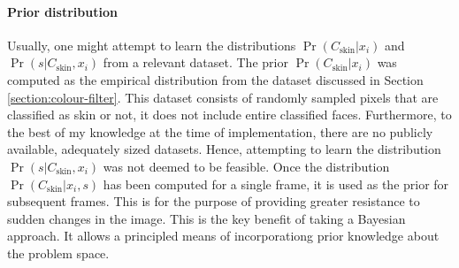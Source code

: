 \paragraph{Prior distribution}
Usually, one might attempt to learn the distributions $\Pr(C_\mathrm{skin}|x_i)$ and $\Pr(s|C_\mathrm{skin}, x_i)$ from  a relevant dataset.
The prior $\Pr(C_\mathrm{skin}|x_i)$ was computed as the empirical distribution from 
the dataset discussed in Section \ref{section:colour-filter}. This dataset consists of randomly sampled pixels that are classified as skin or not, it does not include entire classified faces.
Furthermore, to the best of my knowledge at the time of implementation, there are no publicly available, adequately sized datasets. Hence, attempting to learn the distribution $\Pr(s|C_\mathrm{skin}, x_i)$ was not deemed to be feasible.
Once the distribution $\Pr(C_\mathrm{skin}|x_i,s)$ has been computed for a single frame, it is used as the prior for subsequent frames. This is for the purpose of providing greater resistance to 
sudden changes in the image.
This is the key benefit of taking a Bayesian approach. It allows a principled means of incorporationg prior knowledge about the problem space.
\\\\
